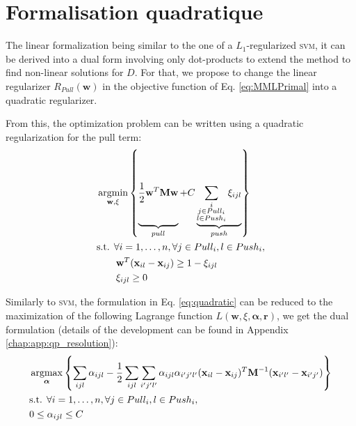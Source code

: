 \section*{Formalisation quadratique}
The linear formalization being similar to the one of a $L_1$-regularized \textsc{svm}, it can be derived into a dual form involving only dot-products to extend the method to find non-linear solutions for $D$. For that, we propose to change the linear regularizer $R_{Pull}(\textbf{w})$ in the objective function of Eq. \ref{eq:MMLPrimal} into a quadratic regularizer. 

\noindent From this, the optimization problem can be written using a quadratic regularization for the pull term:
\begin{equation}
\begin{aligned}
&\displaystyle 		\argmin_{\textbf{w},\xi}
\left\lbrace \underbrace{
	\vphantom{ \sum\limits_{\substack{i \\ j \in Pull_i \\ l \in Push_i}} }
	\frac{1}{2} \textbf{w}^T \textbf{M} \textbf{w}		
}_{pull}				
+					
C
\underbrace{
	\sum\limits_{\substack{i \\ j \in Pull_i \\ l \in Push_i}}  \xi_{ijl}
}_{push}
\right\rbrace  \\
&\text{s.t.  } \forall i = 1, \ldots, n, \forall j \in Pull_i, l \in Push_i, \\
& \qquad \textbf{w}^T(\textbf{x}_{il}-\textbf{x}_{ij}) \geq 1-\xi_{ijl} \\
& \qquad \xi_{ijl} \geq 0 
\end{aligned}
\label{eq:quadratic}
\end{equation}

Similarly to \textsc{svm}, the formulation in Eq. \ref{eq:quadratic} can be reduced to the maximization of the following Lagrange function $L(\textbf{w},\xi,\boldsymbol{\alpha},\textbf{r})$, we get the dual formulation (details of the development can be found in Appendix \ref{chap:app:qp_resolution}):
\begin{equation}
\begin{aligned}
&\displaystyle \argmax_{\boldsymbol{\alpha}} \left\lbrace 
\sum\limits_{ijl} \alpha_{ijl} 
- \frac{1}{2} \sum\limits_{ijl} \sum\limits_{i'j'l'}
\alpha_{ijl} \alpha_{i'j'l'}
(\textbf{x}_{il}-\textbf{x}_{ij})^T
\textbf{M}^{-1}
(\textbf{x}_{i'l'}-\textbf{x}_{i'j'}) \right\rbrace \\
&\text{s.t.  } \forall i = 1, \ldots, n, \forall j \in Pull_i, l \in Push_i, \\
& 0 \leq \alpha_{ijl} \leq C
\end{aligned}
\label{eq:OptimDual}
\end{equation}

